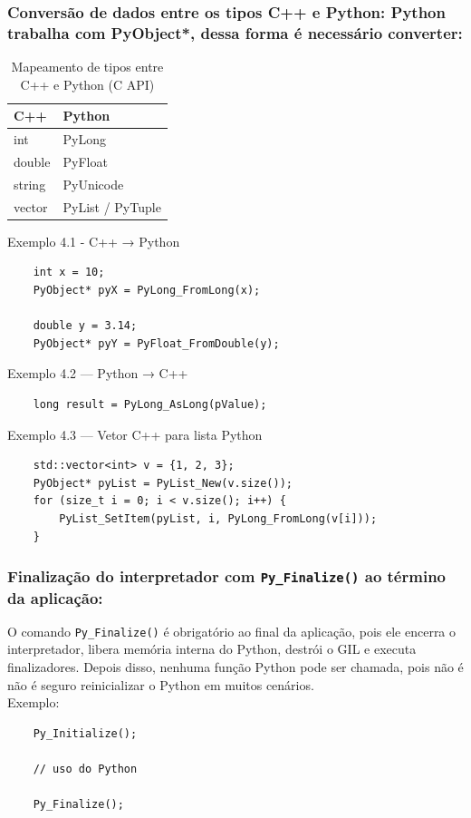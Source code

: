      \subsubsection { Conversão de dados entre os tipos C++ e Python: Python trabalha com PyObject*, dessa forma é necessário converter:}
    \begin{table}[h]
    \centering
    \caption{Mapeamento de tipos entre C++ e Python (C API)}
    \begin{tabular}{|l|l|}
    \hline
    \textbf{C++} & \textbf{Python} \\ \hline
    int & PyLong \\ \hline
    double & PyFloat \\ \hline
    string & PyUnicode \\ \hline
    vector & PyList / PyTuple \\ \hline
    \end{tabular}
    \end{table}
    Exemplo 4.1 - C++ → Python
 \begin{verbatim}
    int x = 10;
    PyObject* pyX = PyLong_FromLong(x);
    
    double y = 3.14;
    PyObject* pyY = PyFloat_FromDouble(y);
 \end{verbatim} 

    Exemplo 4.2 — Python → C++
    \begin{verbatim}
    long result = PyLong_AsLong(pValue);
    \end{verbatim} 

    Exemplo 4.3 — Vetor C++ para lista Python
    \begin{verbatim}
    std::vector<int> v = {1, 2, 3};
    PyObject* pyList = PyList_New(v.size());
    for (size_t i = 0; i < v.size(); i++) {
        PyList_SetItem(pyList, i, PyLong_FromLong(v[i]));
    }
    \end{verbatim} 
    
     \subsubsection { Finalização do interpretador com \texttt{Py\_Finalize()} ao término da aplicação:}
     O comando  \texttt{Py\_Finalize()} é obrigatório ao final da aplicação, pois ele encerra o interpretador, libera memória interna do Python, destrói o GIL e executa finalizadores. Depois disso, nenhuma função Python pode ser chamada, pois não é não é seguro reinicializar o Python em muitos cenários.
\\
    Exemplo:
     \begin{verbatim}
    Py_Initialize();

    // uso do Python

    Py_Finalize();
\end{verbatim} 


